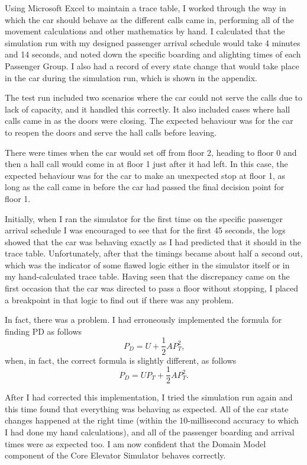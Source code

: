 \documentclass{UoYCSproject}
\begin{document}
Using Microsoft Excel to maintain a trace table, I worked through the way in which the car should behave as the different calls came in, performing all of the movement calculations and other mathematics by hand.  I calculated that the simulation run with my designed passenger arrival schedule would take 4 minutes and 14 seconds, and noted down the specific boarding and alighting times of each Passenger Group.  I also had a record of every state change that would take place in the car during the simulation run, which is shown in the appendix.

The test run included two scenarios where the car could not serve the calls due to lack of capacity, and it handled this correctly.  It also included cases where hall calls came in as the doors were closing.  The expected behaviour was for the car to reopen the doors and serve the hall calls before leaving.

There were times when the car would set off from floor 2, heading to floor 0 and then a hall call would come in at floor 1 just after it had left.  In this case, the expected behaviour was for the car to make an unexpected stop at floor 1, as long as the call came in before the car had passed the final decision point for floor 1.

Initially, when I ran the simulator for the first time on the specific passenger arrival schedule I was encouraged to see that for the first 45 seconds, the logs showed that the car was behaving exactly as I had predicted that it should in the trace table.  Unfortunately, after that the timings became about half a second out, which was the indicator of some flawed logic either in the simulator itself or in my hand-calculated trace table.  Having seen that the discrepancy came on the first occasion that the car was directed to pass a floor without stopping, I placed a breakpoint in that logic to find out if there was any problem.

In fact, there was a problem.  I had erroneously implemented the formula for finding PD as follows
\[ P_D = U + \frac{1}{2}AP_T^2 \text{,} \]
when, in fact, the correct formula is slightly different, as follows
\[ P_D = UP_T + \frac{1}{2}AP_T^2 \text{.} \]

After I had corrected this implementation, I tried the simulation run again and this time found that everything was behaving as expected.  All of the car state changes happened at the right time (within the 10-millisecond accuracy to which I had done my hand calculations), and all of the passenger boarding and arrival times were as expected too.  I am now confident that the Domain Model component of the Core Elevator Simulator behaves correctly.
\end{document}
